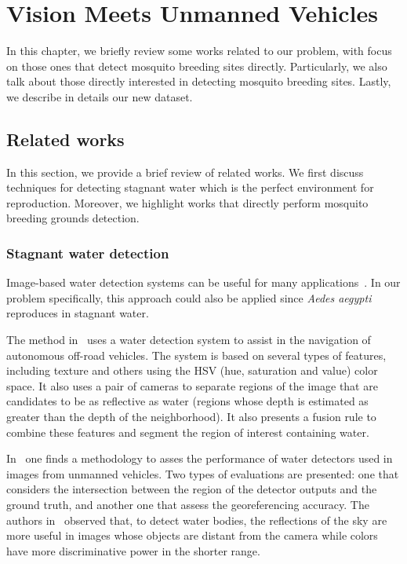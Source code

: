 \chapter{Vision Meets Unmanned Vehicles}
\label{chap:database}

In this chapter, we briefly review some works related to our problem, with focus on those ones that detect mosquito breeding sites directly.
Particularly, we also talk about those directly interested in detecting mosquito breeding sites.
Lastly, we describe in details our new dataset.

\section{Related works}\label{sec:trab_rel}
In this section, we provide a brief review of related works.
We first discuss techniques for detecting stagnant water which is the perfect environment for \Aedes reproduction.
Moreover, we highlight works that directly perform mosquito breeding grounds detection.

%
\subsection{Stagnant water detection}
Image-based water detection systems can be useful for many applications~\cite{Rankin2006, Rankin2010a, Rankin2010b, Zhang2010b, Rankin2011a, Santana2012a, Zhong2013a}.
In our problem specifically, this approach could also be applied since \textit{Aedes aegypti} reproduces in stagnant water.

The method in~\cite{Rankin2006} uses a water detection system to assist in the navigation of autonomous off-road vehicles.
The system is based on several types of features, including texture and others using the HSV (hue, saturation and value) color space.
It also uses a pair of cameras to separate regions of the image that are candidates to be as reflective as water (regions whose depth is estimated as greater than the depth of the neighborhood).
It also presents a fusion rule to combine these features and segment the region of interest containing water.

In~\cite{Rankin2010a} one finds a methodology to asses the performance of water detectors used in images from unmanned vehicles.
Two types of evaluations are presented: one that considers the intersection between the region of the detector outputs and the ground truth, and another one that assess the georeferencing accuracy.
The authors in~\cite{Rankin2010b} observed that, to detect water bodies, the reflections of the sky are more useful in images whose objects are distant from the camera while colors have more discriminative power in the shorter range.

